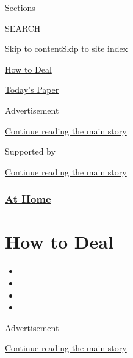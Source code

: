 Sections

SEARCH

\protect\hyperlink{site-content}{Skip to
content}\protect\hyperlink{site-index}{Skip to site index}

\href{https://www.nytimes.com/spotlight/how-to-deal}{How to Deal}

\href{https://myaccount.nytimes.com/auth/login?response_type=cookie\&client_id=vi}{}

\href{https://www.nytimes.com/section/todayspaper}{Today's Paper}

Advertisement

\protect\hyperlink{after-top}{Continue reading the main story}

Supported by

\protect\hyperlink{after-sponsor}{Continue reading the main story}

\hypertarget{at-home}{%
\subsubsection{\texorpdfstring{\href{/spotlight/at-home}{At
Home}}{At Home}}\label{at-home}}

\hypertarget{how-to-deal}{%
\section{How to Deal}\label{how-to-deal}}

\begin{itemize}
\item
\item
\item
\item
\end{itemize}

Advertisement

\protect\hyperlink{after-subheader}{Continue reading the main story}

